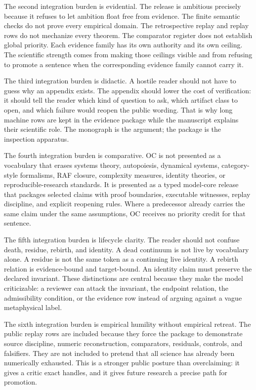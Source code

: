 The second integration burden is evidential. The release is ambitious precisely because it refuses to let ambition float free from evidence. The finite semantic checks do not prove every empirical domain. The retrospective replay and replay rows do not mechanize every theorem. The comparator register does not establish global priority. Each evidence family has its own authority and its own ceiling. The scientific strength comes from making those ceilings visible and from refusing to promote a sentence when the corresponding evidence family cannot carry it.


The third integration burden is didactic. A hostile reader should not have to guess why an appendix exists. The appendix should lower the cost of verification: it should tell the reader which kind of question to ask, which artifact class to open, and which failure would reopen the public wording. That is why long machine rows are kept in the evidence package while the manuscript explains their scientific role. The monograph is the argument; the package is the inspection apparatus.


The fourth integration burden is comparative. OC is not presented as a vocabulary that erases systems theory, autopoiesis, dynamical systems, category-style formalisms, RAF closure, complexity measures, identity theories, or reproducible-research standards. It is presented as a typed model-core release that packages selected claims with proof boundaries, executable witnesses, replay discipline, and explicit reopening rules. Where a predecessor already carries the same claim under the same assumptions, OC receives no priority credit for that sentence.


The fifth integration burden is lifecycle clarity. The reader should not confuse death, residue, rebirth, and identity. A dead continuum is not live by vocabulary alone. A residue is not the same token as a continuing live identity. A rebirth relation is evidence-bound and target-bound. An identity claim must preserve the declared invariant. These distinctions are central because they make the model criticizable: a reviewer can attack the invariant, the endpoint relation, the admissibility condition, or the evidence row instead of arguing against a vague metaphysical label.


The sixth integration burden is empirical humility without empirical retreat. The public replay rows are included because they force the package to demonstrate source discipline, numeric reconstruction, comparators, residuals, controls, and falsifiers. They are not included to pretend that all science has already been numerically exhausted. This is a stronger public posture than overclaiming: it gives a critic exact handles, and it gives future research a precise path for promotion.


